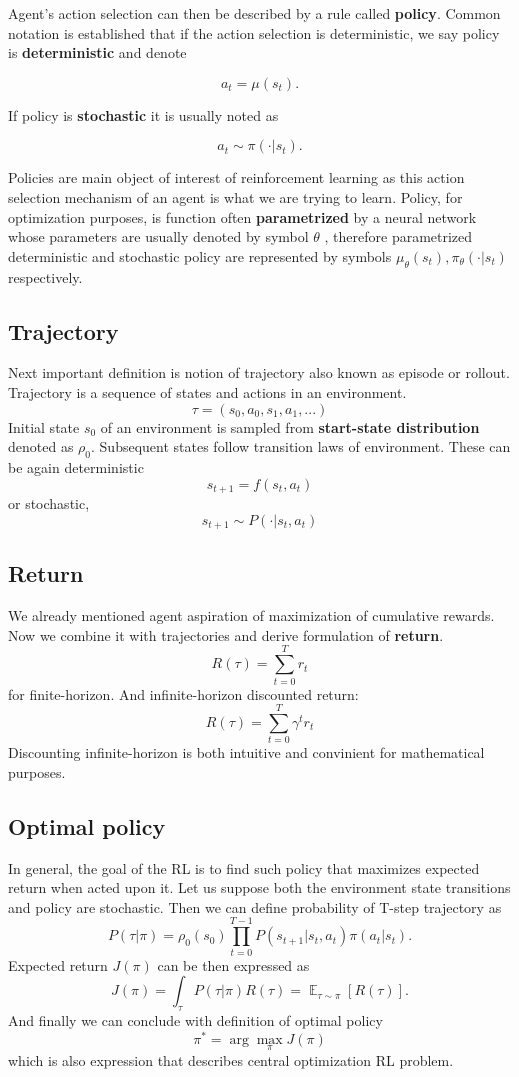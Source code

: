 Agent's action selection can then be described by a rule called \textbf{policy}. 
Common notation is established that if the action selection is deterministic, we say policy is \textbf{deterministic} and denote 

$$
a_t = \mu(s_t).
$$

If policy is \textbf{stochastic} it is usually noted as 

$$a_t \sim \pi(\cdot |s_t).$$

Policies are main object of interest of reinforcement learning as this action selection mechanism of an agent is what we are trying to learn.
Policy, for optimization purposes, is function often \textbf{parametrized} by a neural network whose parameters are usually denoted by symbol
$
    \theta
$
, therefore parametrized deterministic and stochastic policy are represented by symbols     $\mu_\theta(s_t) , \pi_\theta(\cdot |s_t)$ respectively.

\subsection*{Trajectory}
Next important definition is notion of trajectory also known as episode or rollout.
Trajectory is a sequence of states and actions in an environment.
$$\tau = (s_0, a_0, s_1, a_1, ...)$$
Initial state $s_0$ of an environment is sampled from \textbf{start-state distribution} denoted as $\rho_0$. 
Subsequent states follow transition laws of environment. 
These can be again deterministic 
$$s_{t+1} = f(s_t, a_t)$$ or stochastic,
$$s_{t+1} \sim P(\cdot | s_t, a_t)$$

\subsection*{Return}
We already mentioned agent aspiration of maximization of cumulative rewards.
Now we combine it with trajectories and derive formulation of \textbf{return}.
$$R(\tau) = \sum_{t=0}^{T}r_t$$
 for finite-horizon.
And infinite-horizon discounted return:
$$R(\tau) = \sum_{t=0}^{T}\gamma^t r_t$$
Discounting infinite-horizon is both intuitive and convinient for mathematical purposes.



\subsection*{Optimal policy}
In general, the goal of the RL is to find such policy that maximizes expected return when acted upon it.
Let us suppose both the environment state transitions and policy are stochastic. 
Then we can define probability of T-step trajectory as
$$P(\tau|\pi) = \rho_0(s_0) \prod_{t=0}^{T-1} P(s_{t+1}|s_t,a_t)\pi(a_t|s_t).$$
Expected return $J(\pi)$ can be then expressed as
$$J(\pi)=\int_\tau P(\tau|\pi)R(\tau)= \mathop{\mathbb{E}}_{\tau \sim \pi}[R(\tau)].$$
And finally we can conclude with definition of optimal policy 
$$\pi^* = \arg \max_\pi J(\pi)$$
which is also expression that describes central optimization RL problem.

